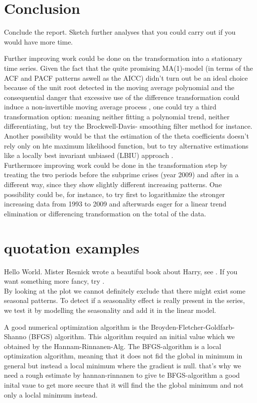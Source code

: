 \documentclass[11pt,a4paper]{article}
\begin{document}
\section{Conclusion}
Conclude the report. Sketch further analyses that you could carry out if you would have more time.

Further improving work could be done on the transformation into a stationary time series. Given the fact that the quite promising MA(1)-model (in terms of the ACF and PACF patterns aswell as the AICC) didn't turn out be an ideal choice because of the unit root detected in the moving average polynomial and the consequential danger that excessive use of the difference transformation could induce a non-invertible moving average process \cite[~p.194]{bd02} \citep{plosser77}, one could try a third transformation option: meaning neither fitting a polynomial trend, neither differentiating, but try the Brockwell-Davis- smoothing filter method for instance. Another possibility would be that the estimation of the theta coefficients doesn't rely only on hte maximum likelihood function, but to try alternative estimations like a locally best invariant unbiased (LBIU) approach \cite{davissong11}. \\
Furthermore improving work could be done in the transformation step by treating the two periods before the subprime crises (year 2009) and after in a different way, since they show slightly different increasing patterns. One possibility could be, for instance, to try first to logarithmize the stronger increasing data from 1993 to 2009 and afterwards eager for a linear trend elimination or differencing transformation on the total of the data.

\section{quotation examples}
Hello World. Mister Resnick wrote a beautiful book about Harry, see \citep{Resnick92}. If you want something more fancy, try \citet{Baddeley07}.
\\By looking at the plot we cannot definitely exclude that there might exist some seasonal patterns. To detect if a seasonality effect is really present in the series, we test it by modelling the seasonality and add it in the linear model. 

A good numerical optimization algorithm is the Broyden-Fletcher-Goldfarb-Shanno (BFGS) algorithm. This algorithm requird an initial value which we obtained by the Hannam-Rinnanen-Alg. The BFGS-algorithm is a local optimization algorithm, meaning that it does not fid the global in minimum in general but instead a local minimum where the gradient is null. that's why we need a rough estimate by hannan-rinnanen to give te BFGS-algorithm a good inital vaue to get more secure that it will find the the global minimum and not only a loclal minimum instead.



\end{document}
